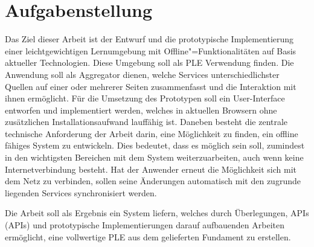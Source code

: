 \section{Aufgabenstellung}
Das Ziel dieser Arbeit ist der Entwurf und die prototypische Implementierung einer leichtgewichtigen Lernumgebung mit Offline"=Funktionalitäten auf Basis aktueller Technologien. Diese Umgebung soll als \ac{PLE} Verwendung finden. Die Anwendung soll als Aggregator dienen, welche Services unterschiedlichster Quellen auf einer oder mehrerer Seiten zusammenfasst und die Interaktion mit ihnen ermöglicht. Für die Umsetzung des Prototypen soll ein User-Interface entworfen und implementiert werden, welches in aktuellen Browsern ohne zusätzlichen Installationsaufwand lauffähig ist. Daneben besteht die zentrale technische Anforderung der Arbeit darin, eine Möglichkeit zu finden, ein offline fähiges System zu entwickeln. Dies bedeutet, dass es möglich sein soll, zumindest in den wichtigsten Bereichen mit dem System weiterzuarbeiten, auch wenn keine Internetverbindung besteht. Hat der Anwender erneut die Möglichkeit sich mit dem Netz zu verbinden, sollen seine Änderungen automatisch mit den zugrunde liegenden Services synchronisiert werden.

Die Arbeit soll als Ergebnis ein System liefern, welches durch Überlegungen, \acsp{API} (\aclp{API}) und prototypische Implementierungen darauf aufbauenden Arbeiten ermöglicht, eine vollwertige \ac{PLE} aus dem gelieferten Fundament zu erstellen.

